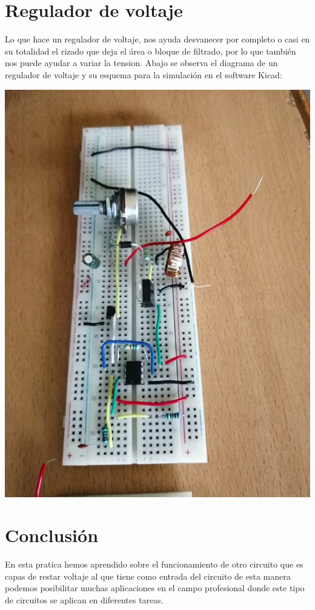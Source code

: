 \documentclass[12pt,a4paper]{article}
\begin{document}
\section{Regulador de voltaje}

Lo que hace un regulador de voltaje, nos ayuda desvanecer por completo o casi en su totalidad el rizado que deja el área o bloque de filtrado, por lo que también nos puede ayudar a variar la tension. Abajo se observa el diagrama de un regulador de voltaje y su esquema para la simulación en el software Kicad:

\begin{center}
\includegraphics[scale=0.5]{imagenes/6.jpeg}
\end{center}
\newpage

\section{Conclusión}

En esta pratica hemos aprendido sobre el funcionamiento de otro circuito que es capas de restar voltaje al que tiene como entrada del circuito de esta manera podemos posibilitar muchas aplicaciones en el campo profesional donde este tipo de circuitos se aplican en diferentes tareas.
\end{document}
